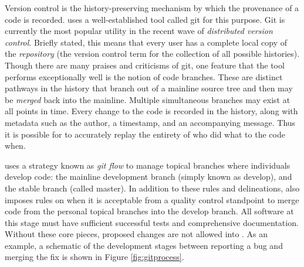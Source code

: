 Version control is the history-preserving mechanism by which the provenance of 
a code is recorded. \Cyclus uses a well-established tool called git 
\cite{software_freedom_conservancy_git_2014}
for this purpose. Git is currently the most popular utility in the recent wave
of \emph{distributed version control}. Briefly stated, this means that every 
user has a complete local copy of the \emph{repository} (the version control
term for the collection of all possible histories).
Though there are many praises and criticisms of git, one 
feature that the tool performs exceptionally well is the notion of code branches.
These are distinct pathways in the history that branch out of a mainline source
tree and then may be \emph{merged} back into the mainline. Multiple simultaneous
branches may exist at all points in time. Every change to the code is recorded
in the history, along with metadata such as the author, a timestamp, and an 
accompanying message. Thus 
it is possible for \Cyclus to accurately replay the entirety of who did what to the
code when.

\Cyclus uses a strategy known as \emph{git flow} 
\cite{kalliamvakou_code-centric_2014} 
to manage topical branches where individuals develop code: the mainline development
branch (simply known as develop), and the stable branch (called master).
In addition to these rules and delineations, \Cyclus also imposes rules on 
when it is acceptable from a quality control standpoint to merge code from 
the personal topical branches into the develop branch. All software at this stage 
must have sufficient successful tests and comprehensive documentation. Without
these core pieces, proposed changes are not allowed into \Cyclus. As an example, a schematic of 
the development stages between reporting a bug and merging the fix is shown in 
Figure \ref{fig:gitprocess}. 

